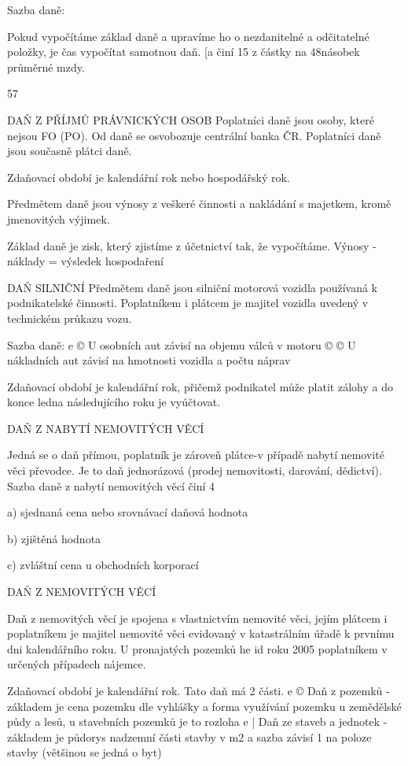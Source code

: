 Sazba daně:

Pokud vypočítáme základ daně a upravíme ho o nezdanitelné a odčitatelné položky, je čas
vypočítat samotnou daň. [a činí 15%
z částky na 48násobek průměrné mzdy.

57


\newpage
DAŇ Z PŘÍJMŮ PRÁVNICKÝCH OSOB
Poplatníci daně jsou osoby, které nejsou FO (PO). Od daně se osvobozuje centrální banka
ČR. Poplatníci daně jsou současně plátci daně.

Zdaňovací období je kalendářní rok nebo hospodářský rok.

Předmětem daně jsou výnosy z veškeré činnosti a nakládání s majetkem, kromě
jmenovitých výjimek.

Základ daně je zisk, který zjistíme z účetnictví tak, že vypočítáme.
Výnosy - náklady = výsledek hospodaření

DAŇ SILNIČNÍ
Předmětem daně jsou silniční motorová vozidla používaná k podnikatelské činnosti.
Poplatníkem i plátcem je majitel vozidla uvedený v technickém průkazu vozu.

Sazba daně:
e © U osobních aut závisí na objemu válců v motoru
© © U nákladních aut závisí na hmotnosti vozidla a počtu náprav

Zdaňovací období je kalendářní rok, přičemž podnikatel může platit zálohy a do konce ledna
následujícího roku je vyúčtovat.

DAŇ Z NABYTÍ NEMOVITÝCH VĚCÍ

Jedná se o daň přímou, poplatník je zároveň plátce-v případě nabytí nemovité věci převodce.
Je to daň jednorázová (prodej nemovitosti, darování, dědictví). Sazba daně z nabytí
nemovitých věcí činí 4%

a) sjednaná cena nebo srovnávací daňová hodnota

b) zjištěná hodnota

c) zvláštní cena u obchodních korporací

DAŇ Z NEMOVITÝCH VĚCÍ

Daň z nemovitých věcí je spojena s vlastnictvím nemovité věci, jejím plátcem i poplatníkem
je majitel nemovité věci evidovaný v katastrálním úřadě k prvnímu dni kalendářního roku. U
pronajatých pozemků he id roku 2005 poplatníkem v určených případech nájemce.

Zdaňovací období je kalendářní rok. Tato daň má 2 části.
e © Daň z pozemků - základem je cena pozemku dle vyhlášky a forma využívání
pozemku u zemědělské půdy a lesů, u stavebních pozemků je to rozloha
e | Daň ze staveb a jednotek - základem je půdorys nadzemní části stavby v m2 a sazba
závisí 1 na poloze stavby (většinou se jedná o byt)

